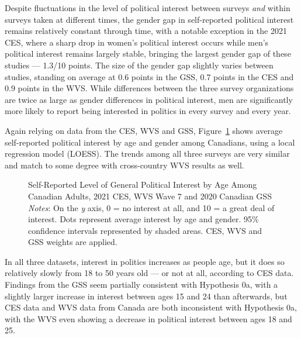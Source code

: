 \documentclass[
  letterpaper,
  DIV=11,
  numbers=noendperiod]{scrreprt}
\begin{document}
Despite fluctuations in the level of political interest between surveys
\emph{and} within surveys taken at different times, the gender gap in
self-reported political interest remains relatively constant through
time, with a notable exception in the 2021 CES, where a sharp drop in
women's political interest occurs while men's political interest remains
largely stable, bringing the largest gender gap of these studies ---
1.3/10 points. The size of the gender gap slightly varies between
studies, standing on average at 0.6 points in the GSS, 0.7 points in the
CES and 0.9 points in the WVS. While differences between the three
survey organizations are twice as large as gender differences in
political interest, men are significantly more likely to report being
interested in politics in every survey and every year.

Again relying on data from the CES, WVS and GSS,
Figure~\ref{fig-timeceswvsgss} shows average self-reported political
interest by age and gender among Canadians, using a local regression
model (LOESS). The trends among all three surveys are very similar and
match to some degree with cross-country WVS results as well.

\begin{figure}


\caption{\label{fig-timeceswvsgss}Self-Reported Level of General
Political Interest by Age Among Canadian Adults, 2021 CES, WVS Wave 7
and 2020 Canadian GSS \newline \textit{Notes}: On the \textit{y} axis, 0
= no interest at all, and 10 = a great deal of interest. Dots represent
average interest by age and gender. 95\% confidence intervals
represented by shaded areas. CES, WVS and GSS weights are applied.}

\end{figure}%

In all three datasets, interest in politics increases as people age, but
it does so relatively slowly from 18 to 50 years old --- or not at all,
according to CES data. Findings from the GSS seem partially consistent
with Hypothesis 0a, with a slightly larger increase in interest between
ages 15 and 24 than afterwards, but CES data and WVS data from Canada
are both inconsistent with Hypothesis 0a, with the WVS even showing a
decrease in political interest between ages 18 and 25.
\end{document}

